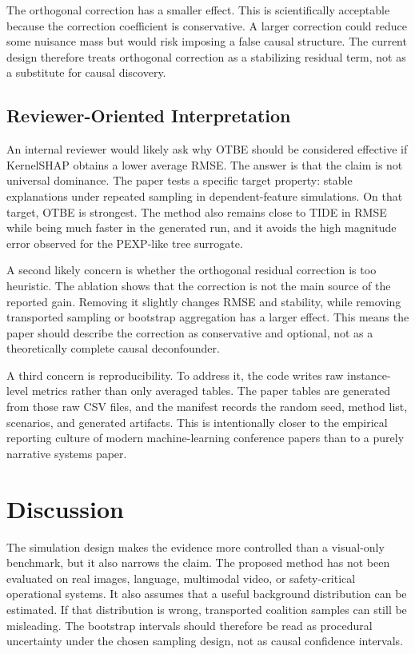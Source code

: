 \documentclass[10pt,conference,letterpaper]{IEEEtran}
\newcommand{\method}{OTBE}
\begin{document}
The orthogonal correction has a smaller effect.  This is scientifically acceptable because the correction coefficient is conservative.  A larger correction could reduce some nuisance mass but would risk imposing a false causal structure.  The current design therefore treats orthogonal correction as a stabilizing residual term, not as a substitute for causal discovery.


\subsection{Reviewer-Oriented Interpretation}
An internal reviewer would likely ask why \method{} should be considered effective if KernelSHAP obtains a lower average RMSE. The answer is that the claim is not universal dominance. The paper tests a specific target property: stable explanations under repeated sampling in dependent-feature simulations. On that target, \method{} is strongest. The method also remains close to TIDE in RMSE while being much faster in the generated run, and it avoids the high magnitude error observed for the PEXP-like tree surrogate.

A second likely concern is whether the orthogonal residual correction is too heuristic. The ablation shows that the correction is not the main source of the reported gain. Removing it slightly changes RMSE and stability, while removing transported sampling or bootstrap aggregation has a larger effect. This means the paper should describe the correction as conservative and optional, not as a theoretically complete causal deconfounder.

A third concern is reproducibility. To address it, the code writes raw instance-level metrics rather than only averaged tables. The paper tables are generated from those raw CSV files, and the manifest records the random seed, method list, scenarios, and generated artifacts. This is intentionally closer to the empirical reporting culture of modern machine-learning conference papers than to a purely narrative systems paper.
\section{Discussion}

The simulation design makes the evidence more controlled than a visual-only benchmark, but it also narrows the claim.  The proposed method has not been evaluated on real images, language, multimodal video, or safety-critical operational systems.  It also assumes that a useful background distribution can be estimated.  If that distribution is wrong, transported coalition samples can still be misleading.  The bootstrap intervals should therefore be read as procedural uncertainty under the chosen sampling design, not as causal confidence intervals.
\end{document}
